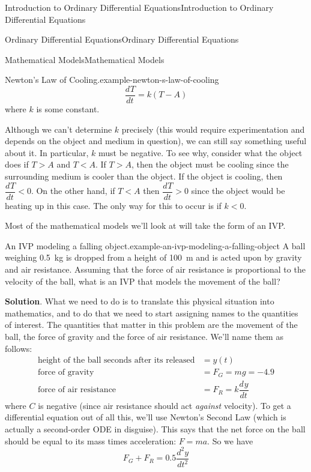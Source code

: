 \documentclass[10pt,]{book}
\numberwithin{equation}{section}
\newcommand{\dv}[3][]{\dfrac{d^{#1} #2}{d #3^{#1}}}
\newcommand{\lt}{<}
\newcommand{\gt}{>}
\begin{document}
\begin{chapterptx}{Introduction to Ordinary Differential Equations}{}{Introduction to Ordinary Differential Equations}{}{}
\begin{sectionptx}{Ordinary Differential Equations}{}{Ordinary Differential Equations}{}{}
\begin{subsectionptx}{Mathematical Models}{}{Mathematical Models}{}{}
\begin{example}{Newton's Law of Cooling.}{example-newton-s-law-of-cooling}
\begin{equation*}
\dv{T}{t} = k(T-A)
\end{equation*}
where \(k\) is some constant.%
\par
\hypertarget{p-29}{}%
Although we can't determine \(k\) precisely (this would require experimentation and depends on the object and medium in question), we can still say something useful about it. In particular, \(k\) must be negative. To see why, consider what the object does if \(T\gt A\) and \(T\lt A\). If \(T\gt A\), then the object must be cooling since the surrounding medium is cooler than the object. If the object is cooling, then \(\dv{T}{t}\lt0\). On the other hand, if \(T\lt A\) then \(\dv{T}{t}\gt0\) since the object would be heating up in this case. The only way for this to occur is if \(k\lt0\).%
\end{example}
\hypertarget{p-30}{}%
Most of the mathematical models we'll look at will take the form of an IVP.%
\begin{example}{An IVP modeling a falling object.}{example-an-ivp-modeling-a-falling-object}%
\hypertarget{p-31}{}%
A ball weighing \SI{0.5}{\kilo\gram} is dropped from a height of \SI{100}{\meter} and is acted upon by gravity and air resistance. Assuming that the force of air resistance is proportional to the velocity of the ball, what is an IVP that models the movement of the ball?%
\par\smallskip%
\noindent\textbf{Solution}.\hypertarget{solution-5}{}\quad%
\hypertarget{p-32}{}%
What we need to do is to translate this physical situation into mathematics, and to do that we need to start assigning names to the quantities of interest. The quantities that matter in this problem are the movement of the ball, the force of gravity and the force of air resistance. We'll name them as follows:%
\begin{align*}
\text{height of the ball  seconds after its released} &= y(t) \\
\text{force of gravity} &= F_{G} = mg = -4.9\\
\text{force of air resistance} &= F_{R} = k\dv{y}{t} 
\end{align*}
where \(C\) is negative (since air resistance should act \emph{against} velocity). To get a differential equation out of all this, we'll use Newton's Second Law (which is actually a second-order ODE in disguise). This says that the net force on the ball should be equal to its mass times acceleration: \(F = ma\). So we have%
\begin{equation*}
F_{G}+F_{R} = 0.5\dv[2]{y}{t}

\end{equation*}
\end{example}
\end{subsectionptx}
\end{sectionptx}
\end{chapterptx}
\end{document}
